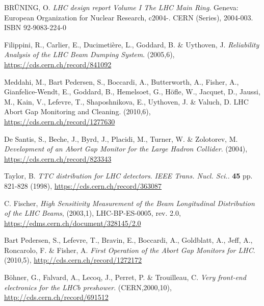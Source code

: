 %
{\printbibliography}{

    \begin{thebibliography}{99}
	
         BR\"UNING, O. \emph{LHC design report Volume I The LHC
            Main Ring}. Geneva: European Organization for Nuclear Research, c2004-. CERN
            (Series), 2004-003. ISBN 92-9083-224-0

         Filippini, R., Carlier, E., Ducimetière, L., Goddard,
            B. \& Uythoven, J. \emph{Reliability Analysis of the LHC Beam Dumping System}.
            (2005,6), \url{https://cds.cern.ch/record/841092}

        Meddahi, M., Bart Pedersen, S., Boccardi, A.,
            Butterworth, A., Fisher, A., Gianfelice-Wendt, E., Goddard, B., Hemelsoet,
            G., Höfle, W., Jacquet, D., Jaussi, M., Kain, V., Lefevre, T., Shaposhnikova,
            E., Uythoven, J. \& Valuch, D. LHC Abort Gap Monitoring and Cleaning.
            (2010,6), \url{https://cds.cern.ch/record/1277630}

        De Santis, S., Beche, J., Byrd, J., Placidi, M.,
            Turner, W. \& Zolotorev, M. \emph{Development of an Abort Gap Monitor for the
            Large Hadron Collider}.  (2004), \url{https://cds.cern.ch/record/823343}

         Taylor, B. \emph{TTC distribution for LHC detectors}.
            {\em IEEE Trans. Nucl. Sci.}. \textbf{45} pp. 821-828 (1998),
            \url{https://cds.cern.ch/record/363087}

         C. Fischer, \emph{High Sensitivity
            Measurement of the Beam Longitudinal Distribution of the LHC Beams}, 
            (2003,1), LHC-BP-ES-0005, rev. 2.0,
            \url{https://edms.cern.ch/document/328145/2.0}

        Bart Pedersen, S., Lefevre, T., Bravin, E., Boccardi, A.,
          Goldblatt, A., Jeff, A., Roncarolo, F. \& Fisher, A. \emph{First Operation of
          the Abort Gap Monitors for LHC}.  (2010,5), \url{http://cds.cern.ch/record/1272172}

         Böhner, G., Falvard, A., Lecoq, J., Perret, P. \& Trouilleau,
            C. \emph{Very front-end electronics for the LHCb preshower}.  (CERN,2000,10),
            \url{http://cds.cern.ch/record/691512}


\end{thebibliography}}
